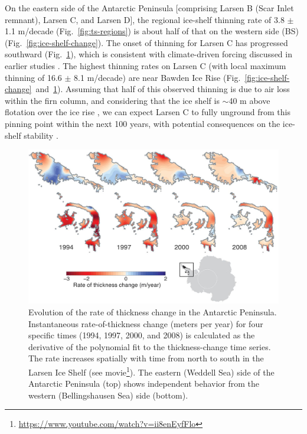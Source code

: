 On the eastern side of the Antarctic Peninsula
[comprising Larsen B (Scar Inlet remnant), Larsen 
C, and Larsen D], the regional ice-shelf thinning
rate of 3.8 $\pm$ 1.1 m/decade (Fig.~\ref{fig:ts-regions}) is about half of
that on the western side (BS) (Fig.~\ref{fig:ice-shelf-change}). The onset of
thinning for Larsen C has progressed southward
(Fig.~\ref{c3f4}), which is consistent with climate-driven
forcing discussed in earlier studies \parencite{Fricker2012, Cook2010}. The
highest thinning rates on Larsen C (with local
maximum thinning of 16.6 $\pm$ 8.1 m/decade) are
near Bawden Ice Rise (Fig.~\ref{fig:ice-shelf-change}~and~\ref{c3f4}). Assuming
that half of this observed thinning is due to air
loss within the firn column, and considering
that the ice shelf is $\sim$40 m above flotation over
the ice rise \parencite{Holland2015}, we can expect Larsen C to fully
unground from this pinning point within the
next 100 years, with potential consequences on
the ice-shelf stability \parencite{Borstad2013}.


\begin{figure}[!h]
  \includegraphics[width=\textwidth]{img/Fig4_antpen_pannels_review_final.jpg}
  \caption[Evolution of the rate of thickness change]{
  Evolution of the rate of thickness
  change in the Antarctic Peninsula. Instantaneous
  rate-of-thickness change (meters per year) for
  four specific times (1994, 1997, 2000, and 2008)
  is calculated as the derivative of the polynomial fit
  to the thickness-change time series. The rate
  increases spatially with time from north to south
  in the Larsen Ice Shelf (see movie\footnote{\url{https://www.youtube.com/watch?v=ii8enEyfFlo}}). The eastern
  (Weddell Sea) side of the Antarctic Peninsula (top)
  shows independent behavior from the western
  (Bellingshausen Sea) side (bottom).
  }
  \label{c3f4}
\end{figure}



